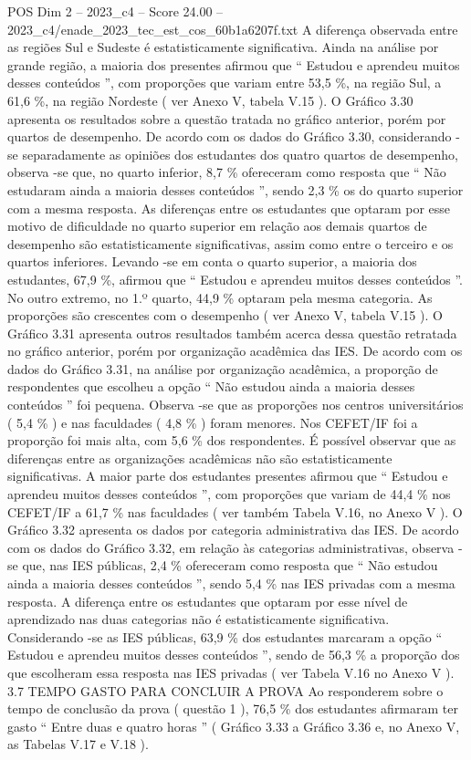\begin{textsample}{POS Dim 2 – 2023\_c4 – Score 24.00 – 2023\_c4/enade\_2023\_tec\_est\_cos\_60b1a6207f.txt}
A diferença observada entre as regiões Sul e Sudeste é estatisticamente significativa.
Ainda na análise por grande região, a maioria dos presentes afirmou que “ Estudou e aprendeu muitos desses conteúdos ”, com proporções que variam entre 53,5 \%, na região Sul, a 61,6 \%, na região Nordeste ( ver Anexo V, tabela V.15 ).
O Gráfico 3.30 apresenta os resultados sobre a questão tratada no gráfico anterior, porém por quartos de desempenho.
De acordo com os dados do Gráfico 3.30, considerando -se separadamente as opiniões dos estudantes dos quatro quartos de desempenho, observa -se que, no quarto inferior, 8,7 \% ofereceram como resposta que “ Não estudaram ainda a maioria desses conteúdos ”, sendo 2,3 \% os do quarto superior com a mesma resposta.
As diferenças entre os estudantes que optaram por esse motivo de dificuldade no quarto superior em relação aos demais quartos de desempenho são estatisticamente significativas, assim como entre o terceiro e os quartos inferiores.
Levando -se em conta o quarto superior, a maioria dos estudantes, 67,9 \%, afirmou que “ Estudou e aprendeu muitos desses conteúdos ”.
No outro extremo, no 1.º quarto, 44,9 \% optaram pela mesma categoria.
As proporções são crescentes com o desempenho ( ver Anexo V, tabela V.15 ).
O Gráfico 3.31 apresenta outros resultados também acerca dessa questão retratada no gráfico anterior, porém por organização acadêmica das IES.
De acordo com os dados do Gráfico 3.31, na análise por organização acadêmica, a proporção de respondentes que escolheu a opção “ Não estudou ainda a maioria desses conteúdos ” foi pequena.
Observa -se que as proporções nos centros universitários ( 5,4 \% ) e nas faculdades ( 4,8 \% ) foram menores.
Nos CEFET/IF foi a proporção foi mais alta, com 5,6 \% dos respondentes.
É possível observar que as diferenças entre as organizações acadêmicas não são estatisticamente significativas.
A maior parte dos estudantes presentes afirmou que “ Estudou e aprendeu muitos desses conteúdos ”, com proporções que variam de 44,4 \% nos CEFET/IF a 61,7 \% nas faculdades ( ver também Tabela V.16, no Anexo V ).
O Gráfico 3.32 apresenta os dados por categoria administrativa das IES.
De acordo com os dados do Gráfico 3.32, em relação às categorias administrativas, observa -se que, nas IES públicas, 2,4 \% ofereceram como resposta que “ Não estudou ainda a maioria desses conteúdos ”, sendo 5,4 \% nas IES privadas com a mesma resposta.
A diferença entre os estudantes que optaram por esse nível de aprendizado nas duas categorias não é estatisticamente significativa.
Considerando -se as IES públicas, 63,9 \% dos estudantes marcaram a opção “ Estudou e aprendeu muitos desses conteúdos ”, sendo de 56,3 \% a proporção dos que escolheram essa resposta nas IES privadas ( ver Tabela V.16 no Anexo V ). 3.7 TEMPO GASTO PARA CONCLUIR A PROVA Ao responderem sobre o tempo de conclusão da prova ( questão 1 ), 76,5 \% dos estudantes afirmaram ter gasto “ Entre duas e quatro horas ” ( Gráfico 3.33 a Gráfico 3.36 e, no Anexo V, as Tabelas V.17 e V.18 ).

\end{textsample}
